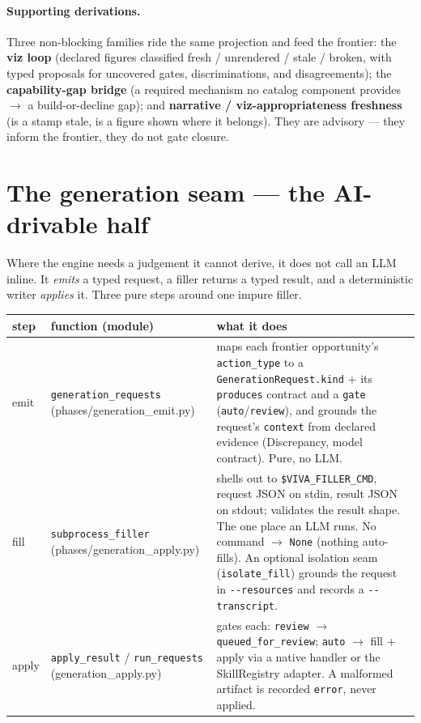 \documentclass[11pt]{article}
\newcommand{\code}[1]{\texttt{\small #1}}
\begin{document}
\paragraph{Supporting derivations.} Three non-blocking families ride the same projection and feed
the frontier: the \textbf{viz loop} (declared figures classified fresh / unrendered / stale /
broken, with typed proposals for uncovered gates, discriminations, and disagreements); the
\textbf{capability-gap bridge} (a required mechanism no catalog component provides $\rightarrow$ a
build-or-decline gap); and \textbf{narrative / viz-appropriateness freshness} (is a stamp stale,
is a figure shown where it belongs). They are advisory --- they inform the frontier, they do not
gate closure.

\section{The generation seam --- the AI-drivable half}\label{sec:seam}

Where the engine needs a judgement it cannot derive, it does not call an LLM inline. It
\emph{emits} a typed request, a filler returns a typed result, and a deterministic writer
\emph{applies} it. Three pure steps around one impure filler.

\begin{center}\small
\begin{tabularx}{\textwidth}{@{}l l Y@{}}
\toprule
\textbf{step} & \textbf{function} \scriptsize(module) & \textbf{what it does}\\
\midrule
emit  & \code{generation\_requests} \scriptsize(phases/generation\_emit.py) & maps each frontier opportunity's \code{action\_type} to a \code{GenerationRequest.kind} + its \code{produces} contract and a \code{gate} (\code{auto}/\code{review}), and grounds the request's \code{context} from declared evidence (Discrepancy, model contract). Pure, no LLM.\\
fill  & \code{subprocess\_filler} \scriptsize(phases/generation\_apply.py) & shells out to \code{\$VIVA\_FILLER\_CMD}, request JSON on stdin, result JSON on stdout; validates the result shape. The one place an LLM runs. No command $\rightarrow$ \code{None} (nothing auto-fills). An optional isolation seam (\code{isolate\_fill}) grounds the request in \code{-{}-resources} and records a \code{-{}-transcript}.\\
apply & \code{apply\_result} / \code{run\_requests} \scriptsize(generation\_apply.py) & gates each: \code{review} $\rightarrow$ \code{queued\_for\_review}; \code{auto} $\rightarrow$ fill + apply via a native handler or the SkillRegistry adapter. A malformed artifact is recorded \code{error}, never applied.\\
\bottomrule
\end{tabularx}
\end{center}
\end{document}
